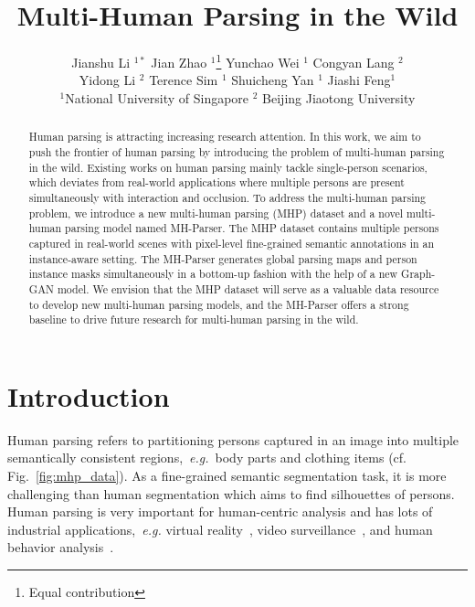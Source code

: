 \documentclass[10pt, letterpaper]{article}
\begin{document}
\title{Multi-Human Parsing in the Wild}

\author{Jianshu Li $^{1*}$ \quad Jian Zhao $^{1}$\thanks{Equal contribution} \quad Yunchao Wei $^{1}$ \quad Congyan Lang $^{2}$ \\ 
\smallskip\smallskip\smallskip
Yidong Li $^{2}$ \quad Terence Sim $^{1}$ \quad Shuicheng Yan $^{1}$ \quad  Jiashi Feng$^{1}$  \\
\smallskip\smallskip\smallskip
$^{1} $National University of Singapore  \quad  $^{2}$ Beijing Jiaotong University \\
}


\maketitle

\begin{abstract}
Human parsing is attracting increasing research attention. In this work, we aim to push the frontier of human parsing by introducing the problem of multi-human parsing in the wild. Existing works on human parsing mainly tackle single-person scenarios, which deviates from real-world applications where multiple persons are present simultaneously with interaction and occlusion. To address the multi-human parsing problem, we introduce a new multi-human parsing (MHP) dataset and a novel multi-human parsing model named MH-Parser. The MHP dataset contains multiple persons captured in real-world scenes with pixel-level fine-grained semantic annotations in an instance-aware setting. The MH-Parser generates global parsing maps and person instance masks simultaneously in a bottom-up fashion with the help of a new Graph-GAN model. We envision that the MHP dataset will serve as a valuable data resource to develop new multi-human parsing models, and the MH-Parser offers a strong baseline to drive future research for multi-human parsing in the wild.
\end{abstract}


\section{Introduction}
Human parsing refers to partitioning persons captured in an image into multiple semantically consistent regions,~\emph{e.g.}~body parts and clothing items (cf. Fig.~\ref{fig:mhp_data}). As a fine-grained semantic segmentation task, it is more challenging than human segmentation which aims to find silhouettes of persons. Human parsing is very important for human-centric analysis and has lots of industrial applications,~\emph{e.g.} virtual reality~\cite{lin2016virtual}, video surveillance~\cite{collins2000system}, and human behavior analysis~\cite{gan2016concepts,liang2015proposal}. 
\end{document}
